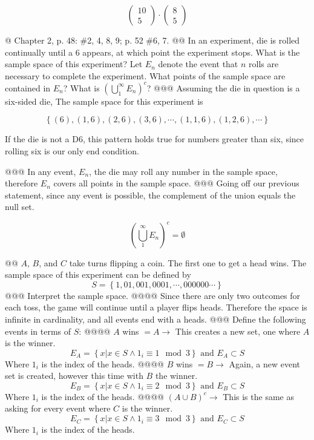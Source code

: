 \documentclass[10pt]{article}
\begin{document}
\begin{easylist}[enumerate]
    \[ \boxed{\begin{pmatrix}10\\5\end{pmatrix} \cdot \begin{pmatrix}8\\5\end{pmatrix} } \]

    @ Chapter 2, p. 48: \#2, 4, 8, 9; p. 52 \#6, 7.
    @@ In an experiment, die is rolled continually until a 6 appears, at which point the experiment stops. What is the sample space of this experiment? Let $E_n$ denote the event that $n$ rolls are necessary to complete the experiment. What points of the sample space are contained in $E_n$? What is ${\left( \bigcup^\infty_1 E_n \right)}^c$?
    @@@ Assuming the die in question is a six-sided die, The sample space for this experiment is

       \[ \left\{ (6), (1,6), (2, 6), (3, 6), \cdots, (1, 1, 6), (1, 2, 6), \cdots \right\} \]

       If the die is not a D6, this pattern holds true for numbers greater than six, since rolling six is our only end condition.

    @@@ In any event, $E_n$, the die may roll any number in the sample space, therefore $E_n$ covers all points in the sample space.
    @@@ Going off our previous statement, since any event is possible, the complement of the union equals the null set.

       \[{\left( \bigcup^\infty_1 E_n \right)}^c = \emptyset \]

    @@ $A$, $B$, and $C$ take turns flipping a coin. The first one to get a head wins. The sample space of this experiment can be defined by
       \[ S = \left\{ 1, 01, 001, 0001, \cdots, 000000\cdots \right\} \]
    @@@ Interpret the sample space.
    @@@@ Since there are only two outcomes for each toss, the game will continue until a player flips heads. Therefore the space is infinite in cardinality, and all events end with a heads.
    @@@ Define the following events in terms of $S$:
    @@@@ $A$ wins $ = A \to $ This creates a new set, one where $A$ is the winner.
       \[ E_A = \left\{ x | x \in S \wedge 1_i \equiv 1 \mod 3 \right\} \text{ and } E_A \subset S \]
       Where $1_i$ is the index of the heads.
    @@@@ $B$ wins $ = B \to$ Again, a new event set is created, however this time with $B$ the winner.
       \[ E_B = \left\{ x | x \in S \wedge 1_i \equiv 2 \mod 3 \right\} \text{ and } E_B \subset S \]
       Where $1_i$ is the index of the heads.
    @@@@ ${(A \cup B)}^c \to$ This is the same as asking for every event where $C$ is the winner.
       \[ E_C = \left\{ x | x \in S \wedge 1_i \equiv 3 \mod 3 \right\} \text{ and } E_C \subset S \]
       Where $1_i$ is the index of the heads.


\end{easylist}
\end{document}
